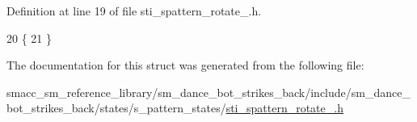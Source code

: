 Definition at line 19 of file sti\+\_\+spattern\+\_\+rotate\+\_.\+h.


\begin{DoxyCode}
20     \{
21     \}
\end{DoxyCode}


The documentation for this struct was generated from the following file\+:\begin{DoxyCompactItemize}
\item 
smacc\+\_\+sm\+\_\+reference\+\_\+library/sm\+\_\+dance\+\_\+bot\+\_\+strikes\+\_\+back/include/sm\+\_\+dance\+\_\+bot\+\_\+strikes\+\_\+back/states/s\+\_\+pattern\+\_\+states/\hyperlink{strikes__back_2include_2sm__dance__bot__strikes__back_2states_2s__pattern__states_2sti__spattern__rotate__1_8h}{sti\+\_\+spattern\+\_\+rotate\+\_.\+h}\end{DoxyCompactItemize}
